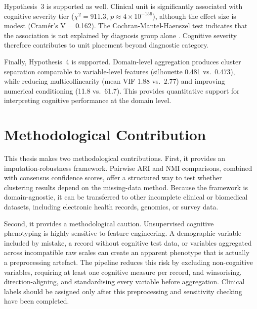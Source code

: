 Hypothesis~3 is supported as well. Clinical unit is significantly associated with cognitive severity tier ($\chi^2 = 911.3$, $p \approx 4 \times 10^{-156}$), although the effect size is modest (Cram\'{e}r's V = 0.162). The Cochran-Mantel-Haenszel test indicates that the association is not explained by diagnosis group alone \parencite{cochran1954some}. Cognitive severity therefore contributes to unit placement beyond diagnostic category.

Finally, Hypothesis~4 is supported. Domain-level aggregation produces cluster separation comparable to variable-level features (silhouette 0.481 vs.\ 0.473), while reducing multicollinearity (mean VIF 1.88 vs.\ 2.77) and improving numerical conditioning (11.8 vs.\ 61.7). This provides quantitative support for interpreting cognitive performance at the domain level.


\section{Methodological Contribution}

This thesis makes two methodological contributions. First, it provides an imputation-robustness framework. Pairwise ARI and NMI comparisons, combined with consensus confidence scores, offer a structured way to test whether clustering results depend on the missing-data method. Because the framework is domain-agnostic, it can be transferred to other incomplete clinical or biomedical datasets, including electronic health records, genomics, or survey data.

Second, it provides a methodological caution. Unsupervised cognitive phenotyping is highly sensitive to feature engineering. A demographic variable included by mistake, a record without cognitive test data, or variables aggregated across incompatible raw scales can create an apparent phenotype that is actually a preprocessing artefact. The pipeline reduces this risk by excluding non-cognitive variables, requiring at least one cognitive measure per record, and winsorising, direction-aligning, and standardising every variable before aggregation. Clinical labels should be assigned only after this preprocessing and sensitivity checking have been completed.


